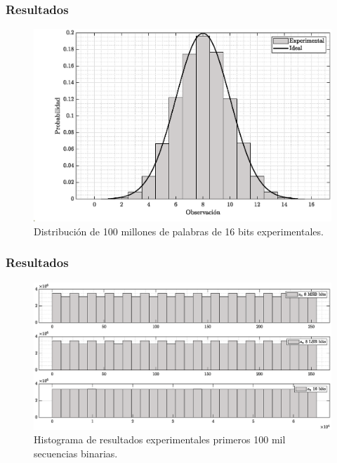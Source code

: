 \documentclass[10pt]{beamer}
\begin{document}
\begin{frame}
    \frametitle{Resultados}
    \begin{figure}[hbtp]
            \centering
            \includegraphics[width=0.8\linewidth]{J3_distribucion}
            \caption{Distribución de 100 millones de palabras de 16 bits experimentales.}
            \label{fig:J3_distribucion}
        \end{figure}
\end{frame}

\begin{frame}
    \frametitle{Resultados}
         \begin{figure}[hbtp]
            \centering
            \includegraphics[width=0.95\linewidth]{Z4_distribucion_normal}
            \caption{Histograma de resultados experimentales primeros 100 mil secuencias binarias.}
            \label{fig:J4_distribucion}
        \end{figure}
\end{frame}
\end{document}

